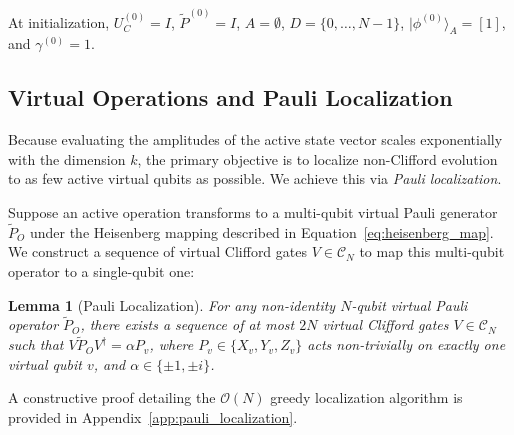 \documentclass[a4paper, onecolumn, unpublished]{quantumarticle}
\newtheorem{lemma}{Lemma}
\begin{document}
    At initialization, $U_C^{(0)}=I$, $\tilde{P}^{(0)}=I$, $A=\emptyset$, $D=\{0,\ldots,N-1\}$, $|\phi^{(0)}\rangle_A=[1]$, and $\gamma^{(0)}=1$.

    \subsection{Virtual Operations and Pauli Localization}
    \label{sec:virtual_ops}

    Because evaluating the amplitudes of the active state vector scales exponentially with the dimension $k$, the primary objective is to localize non-Clifford evolution to as few active virtual qubits as possible. We achieve this via \emph{Pauli localization}.

    Suppose an active operation transforms to a multi-qubit virtual Pauli generator $\tilde{P}_O$ under the Heisenberg mapping described in Equation~\ref{eq:heisenberg_map}. We construct a sequence of virtual Clifford gates $V \in \mathcal{C}_N$ to map this multi-qubit operator to a single-qubit one:

    \begin{lemma}[Pauli Localization]
        \label{lem:pauli_localization}
        For any non-identity $N$-qubit virtual Pauli operator $\tilde{P}_O$, there exists a sequence of at most $2N$ virtual Clifford gates $V \in \mathcal{C}_N$ such that $V \tilde{P}_O V^\dagger = \alpha P_v$, where $P_v \in \{X_v, Y_v, Z_v\}$ acts non-trivially on exactly one virtual qubit $v$, and $\alpha \in \{\pm 1, \pm i\}$.
    \end{lemma}

    A constructive proof detailing the $\mathcal{O}(N)$ greedy localization algorithm is provided in Appendix~\ref{app:pauli_localization}.
\end{document}
